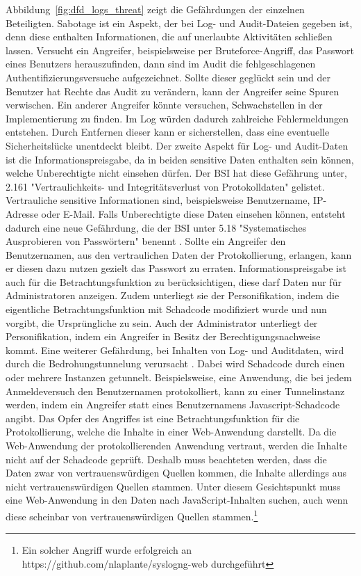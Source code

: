\documentclass[11pt,a4paper]{report}
\begin{document}
Abbildung~\ref{fig:dfd_logs_threat} zeigt die Gefährdungen der einzelnen Beteiligten. Sabotage ist ein Aspekt, der bei Log- und Audit-Dateien gegeben ist, denn diese enthalten Informationen, die auf unerlaubte Aktivitäten schließen lassen. Versucht ein Angreifer, beispielsweise per Bruteforce-Angriff, das Passwort eines Benutzers herauszufinden, dann sind im Audit die fehlgeschlagenen Authentifizierungsversuche aufgezeichnet. Sollte dieser geglückt sein und der Benutzer hat Rechte das Audit zu verändern, kann der Angreifer seine Spuren verwischen. Ein anderer Angreifer könnte versuchen, Schwachstellen in der Implementierung zu finden. Im Log würden dadurch zahlreiche Fehlermeldungen entstehen. Durch Entfernen dieser kann er sicherstellen, dass eine eventuelle Sicherheitslücke unentdeckt bleibt. Der zweite Aspekt für Log- und Audit-Daten ist die Informationspreisgabe, da in beiden sensitive Daten enthalten sein können, welche Unberechtigte nicht einsehen dürfen. Der BSI hat diese Gefährung unter, 2.161 "Vertraulichkeits- und Integritätsverlust von Protokolldaten" \cite{bsi_g2161} gelistet. Vertrauliche sensitive Informationen sind, beispielsweise Benutzername, IP-Adresse oder E-Mail. Falls Unberechtigte diese Daten einsehen können, entsteht dadurch eine neue Gefährdung, die der BSI unter 5.18 "Systematisches Ausprobieren von Passwörtern" benennt \cite{bsi_g5018}. Sollte ein Angreifer den Benutzernamen, aus den vertraulichen Daten der Protokollierung, erlangen, kann er diesen dazu nutzen gezielt das Passwort zu erraten. Informationspreisgabe ist auch für die Betrachtungsfunktion zu berücksichtigen, diese darf Daten nur für Administratoren anzeigen. Zudem unterliegt sie der Personifikation, indem die eigentliche Betrachtungsfunktion mit Schadcode modifiziert wurde und nun vorgibt, die Ursprüngliche zu sein. Auch der Administrator unterliegt der Personifikation, indem ein Angreifer in Besitz der Berechtigungsnachweise kommt. Eine weiterer Gefährdung, bei Inhalten von Log- und Auditdaten, wird durch die Bedrohungstunnelung verursacht \cite[s.~265]{gutmann}. Dabei wird Schadcode durch einen oder mehrere Instanzen getunnelt. Beispielsweise, eine Anwendung, die bei jedem Anmeldeversuch den Benutzernamen protokolliert, kann zu einer Tunnelinstanz werden, indem ein Angreifer statt eines Benutzernamens Javascript-Schadcode angibt. Das Opfer des Angriffes ist eine Betrachtungsfunktion für die Protokollierung, welche die Inhalte in einer Web-Anwendung darstellt. Da die Web-Anwendung der protokollierenden Anwendung vertraut, werden die Inhalte nicht auf der Schadcode geprüft. Deshalb muss beachteten werden, dass die Daten zwar von vertrauenswürdigen Quellen kommen, die Inhalte allerdings aus nicht vertrauenswürdigen Quellen stammen. Unter diesem Gesichtspunkt muss eine Web-Anwendung in den Daten nach JavaScript-Inhalten suchen, auch wenn diese scheinbar von vertrauenswürdigen Quellen stammen.\footnote{Ein solcher Angriff wurde erfolgreich an https://github.com/nlaplante/syslogng-web durchgeführt}
\end{document}
